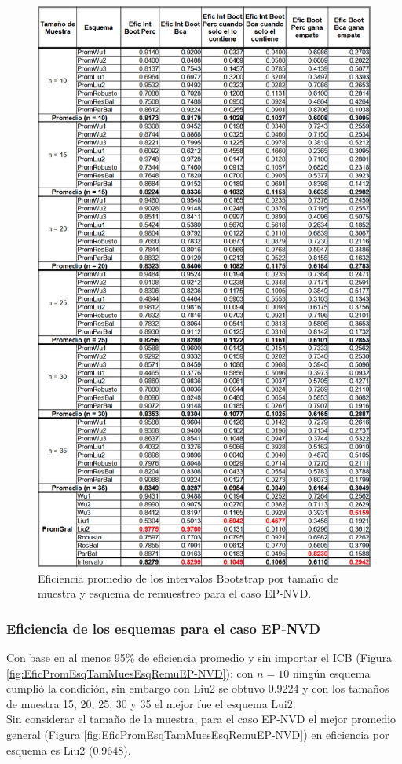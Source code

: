 \begin{figure}[ht] 
	\centering 
	\includegraphics[width=0.55\linewidth]{img/EP_NVD_Efic_Boots.png} 
	\caption{Eficiencia promedio de los intervalos Bootstrap por tamaño de muestra y esquema de remuestreo para el caso EP-NVD.} 
	\label{fig:EficPromIntBootsTamMuestEsqRemuEP-NVD}
\end{figure}
\FloatBarrier

\subsubsection{Eficiencia de los esquemas para el caso EP-NVD}
Con base en al menos 95\% de eficiencia promedio y sin importar el ICB  (Figura \ref{fig:EficPromEsqTamMuesEsqRemuEP-NVD}): con $n=10$ ningún esquema cumplió la condición, sin embargo con Liu2 se obtuvo 0.9224 y con los tamaños de muestra 15, 20, 25, 30 y 35 el mejor fue el esquema Lui2.\\

Sin considerar el tamaño de la muestra, para el caso EP-NVD el mejor promedio general (Figura \ref{fig:EficPromEsqTamMuesEsqRemuEP-NVD}) en eficiencia por esquema es Liu2 (0.9648).


